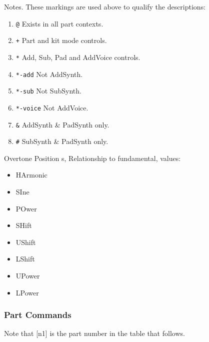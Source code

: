 
Notes.  These markings are used above to qualify the descriptions:

   \begin{enumerate}
      \item \texttt{@} Exists in all part contexts.
      \item \texttt{+} Part and kit mode controls.
      \item \texttt{*} Add, Sub, Pad and AddVoice controls.
      \item \texttt{*-add} Not AddSynth.
      \item \texttt{*-sub} Not SubSynth.
      \item \texttt{*-voice} Not AddVoice.
      \item \texttt{\&} AddSynth \& PadSynth only.
      \item \texttt{\#} SubSynth \& PadSynth only.
   \end{enumerate}

Overtone Position s, Relationship to fundamental, values:

   \begin{itemize}
      \item HArmonic
      \item SIne
      \item POwer
      \item SHift
      \item UShift
      \item LShift
      \item UPower
      \item LPower
   \end{itemize}

\subsubsection{Part Commands}
\label{subsec:command_line_part_commands}

   Note that [n1] is the part number in the table that follows.

